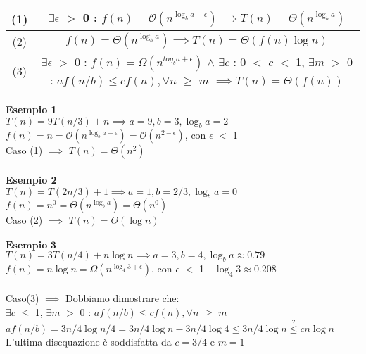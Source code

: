 \documentclass[../cheatSheetAlgoritmi.tex]{subfiles}
\begin{document}
\begin{center}
	\renewcommand{\arraystretch}{1.2}
	\begin{tabular}{ |c|c| } 
		\hline
			(1) & $\exists \epsilon$ $>$ 0 : $f(n) = \mathcal{O}(n^{\log_{b}{a} - \epsilon}) \implies T(n) = \Theta(n^{\log_{b}{a}})$\\
		\hline
			(2) & $f(n) = \Theta(n^{\log_{b}{a}}) \implies T(n) = \Theta(f(n) \log{n})$\\
		\hline
			(3) & \makecell{$\exists \epsilon$ $>$ 0 : $f(n) = \Omega(n^{log_{b}{a} + \epsilon})$ $\wedge$ \\ $\exists c$ : 0 $<$ $c$ $<$ 1, $\exists m$ $>$ 0 : \\ $af(n/b) \leq cf(n), \forall n$ $\geq$ $m$} $\implies T(n) = \Theta(f(n))$ \\
		\hline
	\end{tabular}
\end{center}
\textbf{Esempio 1}\\
$T(n) = 9T(n/3) + n \implies a = 9, b = 3, \log_{b}{a} = 2$\\
$f(n) = n = \mathcal{O}(n^{\log_{b}{a} - \epsilon}) =  \mathcal{O}(n^{2 - \epsilon})$, con $\epsilon$ $<$ 1\\
Caso (1) $\implies$ $T(n) = \Theta(n^{2})$\\\\
\textbf{Esempio 2}\\
$T(n) = T(2n/3) + 1 \implies a = 1, b = 2/3, \log_{b}{a} = 0$\\
$f(n) = n^{0} = \Theta(n^{\log_{b}{a}}) =  \Theta(n^{0})$\\
Caso (2) $\implies$ $T(n) = \Theta(\log{n})$\\\\
$\textbf{Esempio 3}$\\
$T(n) = 3T(n/4) + n\log{n} \implies a = 3, b = 4, \log_{b}{a} \approx 0.79$\\
$f(n) = n\log{n} = \Omega(n^{\log_{4}{3} + \epsilon})$, con $\epsilon$ $<$ 1 - $\log_{4}{3} \approx 0.208$\\\\
Caso(3) $\implies$ Dobbiamo dimostrare che:\\
$\exists c$ $\leq$ 1, $\exists m$ $>$ 0 : $af(n/b) \leq cf(n), \forall n$ $\geq$ $m$\\
$af(n/b) = 3n/4\log{n/4} = 3n/4\log{n} - 3n/4\log{4} \leq 3n/4\log{n} \stackrel{?}{\leq} cn\log{n}$\\
L'ultima disequazione è soddisfatta da $c = 3/4$ e $m = 1$
\end{document}
